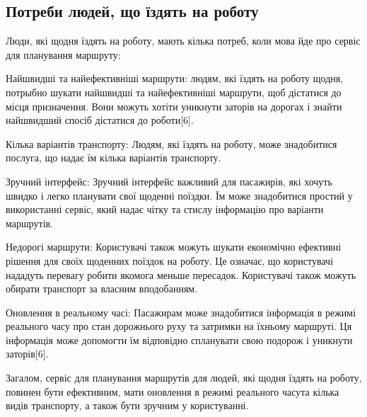 \subsection{Потреби людей, що їздять на роботу}
\label{subsec:workers-needs-subsection}

Люди, які щодня їздять на роботу, мають кілька потреб, коли мова йде про сервіс для планування маршруту:

Найшвидші та найефективніші маршрути: людям, які їздять на роботу щодня, потрыбно шукати найшвидші та найефективніші маршрути, щоб дістатися до місця призначення. Вони можуть хотіти уникнути заторів на дорогах і знайти найшвидший спосіб дістатися до роботи[6].

Кілька варіантів транспорту: Людям, які їздять на роботу, може знадобитися послуга, що надає їм кілька варіантів транспорту.

Зручний інтерфейс: Зручний інтерфейс важливий для пасажирів, які хочуть швидко і легко планувати свої щоденні поїздки. Їм може знадобитися простий у використанні сервіс, який надає чітку та стислу інформацію про варіанти маршрутів.

Недорогі маршрути: Користувачі також можуть шукати економічно ефективні рішення для своїх щоденних поїздок на роботу. Це означає, що користувачі нададуть перевагу робити якомога меньше пересадок. Користувачі також можуть обирати транспорт за власним вподобанням.

Оновлення в реальному часі: Пасажирам може знадобитися інформація в режимі реального часу про стан дорожнього руху та затримки на їхньому маршруті. Ця інформація може допомогти їм відповідно спланувати свою подорож і уникнути заторів[6].

Загалом, сервіс для планування маршрутів для людей, які щодня їздять на роботу, повинен бути ефективним, мати оновлення в режимі реального часута кілька видів транспорту, а також бути зручним у користуванні.